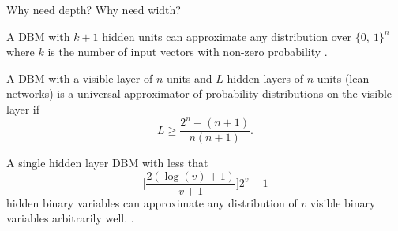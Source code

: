 \documentclass[8pt]{beamer}
\begin{document}
\begin{frame}[label={sec:org15d42bb}]{Why need depth? Why need width?}
\begin{theorem}
A DBM with \(k+1\) hidden units can approximate any distribution over \(\{0,~1\}^n\) where \(k\) is the number of input vectors with non-zero probability \cite{leroux2008representational}.
\hfill \blacksquare
\label{org8221a4c}
\end{theorem}
\begin{theorem}[Montufar 2014]
A DBM with a visible layer of \(n\) units and \(L\) hidden layers of \(n\) units (lean networks) is a universal approximator of probability distributions on the visible layer if \cite{montufar2014deep}
\[
L \geq \frac{2^n-(n+1)}{n(n+1)}.
\]
\hfill \blacksquare
\label{orgd88c08b}
\end{theorem}
\begin{theorem}[Montufar 2017]
A single hidden layer DBM with less that
\[
\bigg[\frac{2(\log (v)+1)}{v+1}\bigg] 2^{v}-1
\]
hidden binary variables can approximate any distribution of \(v\) visible binary variables arbitrarily well. \cite{montufar2017hierarchical}.
\hfill \blacksquare
\label{org23a4fcc}
\end{theorem}
\end{frame}
\end{document}
